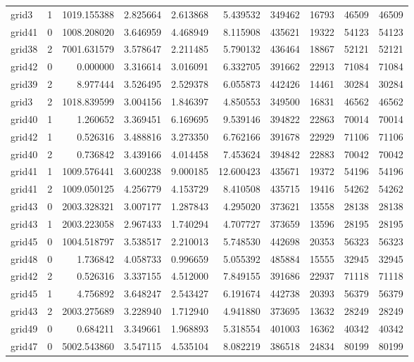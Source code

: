 \begin{longtable}{|l|r|r|r|r|r|r|r|r|r|}
grid3 & 1 & 1019.155388 & 2.825664 & 2.613868 & 5.439532 & 349462 & 16793 & 46509 & 46509 \\
grid41 & 0 & 1008.208020 & 3.646959 & 4.468949 & 8.115908 & 435621 & 19322 & 54123 & 54123 \\
grid38 & 2 & 7001.631579 & 3.578647 & 2.211485 & 5.790132 & 436464 & 18867 & 52121 & 52121 \\
grid42 & 0 & 0.000000 & 3.316614 & 3.016091 & 6.332705 & 391662 & 22913 & 71084 & 71084 \\
grid39 & 2 & 8.977444 & 3.526495 & 2.529378 & 6.055873 & 442426 & 14461 & 30284 & 30284 \\
grid3 & 2 & 1018.839599 & 3.004156 & 1.846397 & 4.850553 & 349500 & 16831 & 46562 & 46562 \\
grid40 & 1 & 1.260652 & 3.369451 & 6.169695 & 9.539146 & 394822 & 22863 & 70014 & 70014 \\
grid42 & 1 & 0.526316 & 3.488816 & 3.273350 & 6.762166 & 391678 & 22929 & 71106 & 71106 \\
grid40 & 2 & 0.736842 & 3.439166 & 4.014458 & 7.453624 & 394842 & 22883 & 70042 & 70042 \\
grid41 & 1 & 1009.576441 & 3.600238 & 9.000185 & 12.600423 & 435671 & 19372 & 54196 & 54196 \\
grid41 & 2 & 1009.050125 & 4.256779 & 4.153729 & 8.410508 & 435715 & 19416 & 54262 & 54262 \\
grid43 & 0 & 2003.328321 & 3.007177 & 1.287843 & 4.295020 & 373621 & 13558 & 28138 & 28138 \\
grid43 & 1 & 2003.223058 & 2.967433 & 1.740294 & 4.707727 & 373659 & 13596 & 28195 & 28195 \\
grid45 & 0 & 1004.518797 & 3.538517 & 2.210013 & 5.748530 & 442698 & 20353 & 56323 & 56323 \\
grid48 & 0 & 1.736842 & 4.058733 & 0.996659 & 5.055392 & 485884 & 15555 & 32945 & 32945 \\
grid42 & 2 & 0.526316 & 3.337155 & 4.512000 & 7.849155 & 391686 & 22937 & 71118 & 71118 \\
grid45 & 1 & 4.756892 & 3.648247 & 2.543427 & 6.191674 & 442738 & 20393 & 56379 & 56379 \\
grid43 & 2 & 2003.275689 & 3.228940 & 1.712940 & 4.941880 & 373695 & 13632 & 28249 & 28249 \\
grid49 & 0 & 0.684211 & 3.349661 & 1.968893 & 5.318554 & 401003 & 16362 & 40342 & 40342 \\
grid47 & 0 & 5002.543860 & 3.547115 & 4.535104 & 8.082219 & 386518 & 24834 & 80199 & 80199 \\

\end{longtable}
